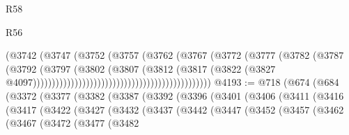 \begin{lexlean}{R58}
\begin{lexlean}{R56}
\begin{coremodule}
{{{{{{{{{{{{{{{{{{{{{{{{{{{{{{{{{{{{{{{{{{{{{{{{{{{{{{{{{{{{{{{{{{{{{{{{{{{{{{{{{{{{{{{{{{{{{{{{{{{{{{{{{{{{{{{{{{{{{{{{{{{{{{{{{{{{{{{{{{{{{{{{{{{{{{{{{{{{{{{{{{{{{{{{{{{{{{{{{{{{{{{{{{{{{{{{{{{{{{{{{{{{{{{{{{{                                                              (@3742
                                                                (@3747
                                                                  (@3752
                                                                    (@3757
                                                                      (@3762
                                                                        (@3767
                                                                          (@3772
                                                                            (@3777
                                                                              (@3782
                                                                                (@3787
                                                                                  (@3792
                                                                                    (@3797
                                                                                      (@3802
                                                                                        (@3807
                                                                                          (@3812
                                                                                            (@3817
                                                                                              (@3822
                                                                                                (@3827
                                                                                                  @4097)))))))))))))))))))))))))))))))))))))))))))))))
@4193 := @718
    (@674
      (@684
        (@3372
          (@3377
            (@3382
              (@3387
                (@3392
                  (@3396
                    (@3401
                      (@3406
                        (@3411
                          (@3416
                            (@3417
                              (@3422
                                (@3427
                                  (@3432
                                    (@3437
                                      (@3442
                                        (@3447
                                          (@3452
                                            (@3457
                                              (@3462
                                                (@3467
                                                  (@3472
                                                    (@3477
                                                      (@3482
}}}}}}}}}}}}}}}}}}}}}}}}}}}}}}}}}}}}}}}}}}}}}}}}}}}}}}}}}}}}}}}}}}}}}}}}}}}}}}}}}}}}}}}}}}}}}}}}}}}}}}}}}}}}}}}}}}}}}}}}}}}}}}}}}}}}}}}}}}}}}}}}}}}}}}}}}}}}}}}}}}}}}}}}}}}}}}}}}}}}}}}}}}}}}}}}}}}}}}}}}}}}}}}}}}}
\end{coremodule}
\end{lexlean}
\end{lexlean}

